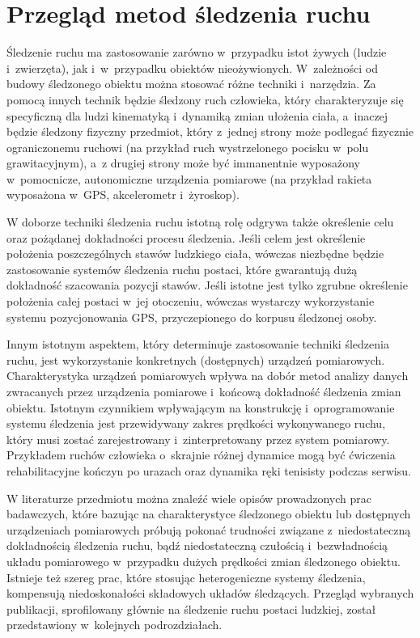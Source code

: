 \chapter{Przegląd metod śledzenia ruchu}\label{chap:literature}

Śledzenie ruchu ma zastosowanie zarówno w~przypadku istot żywych (ludzie i~zwierzęta), jak i~w~przypadku obiektów nieożywionych. W~zależności od budowy śledzonego obiektu można stosować różne techniki i~narzędzia. Za pomocą innych technik będzie śledzony ruch człowieka, który charakteryzuje się specyficzną dla ludzi kinematyką i~dynamiką zmian ułożenia ciała, a~inaczej będzie śledzony fizyczny przedmiot, który z~jednej strony może podlegać fizycznie ograniczonemu ruchowi (na przykład ruch wystrzelonego pocisku w~polu grawitacyjnym), a~z drugiej strony może być immanentnie wyposażony w~pomocnicze, autonomiczne urządzenia pomiarowe (na przykład rakieta wyposażona w~GPS, akcelerometr i~żyroskop). 

W doborze techniki śledzenia ruchu istotną rolę odgrywa także określenie celu oraz pożądanej dokładności procesu śledzenia. Jeśli celem jest określenie położenia poszczególnych stawów ludzkiego ciała, wówczas niezbędne będzie zastosowanie systemów śledzenia ruchu postaci, które gwarantują dużą dokładność szacowania pozycji stawów. Jeśli istotne jest tylko zgrubne określenie położenia całej postaci w~jej otoczeniu, wówczas wystarczy wykorzystanie systemu pozycjonowania GPS, przyczepionego do korpusu śledzonej osoby.

Innym istotnym aspektem, który determinuje zastosowanie techniki śledzenia ruchu, jest wykorzystanie konkretnych (dostępnych) urządzeń pomiarowych. Charakterystyka urządzeń pomiarowych wpływa na dobór metod analizy danych zwracanych przez urządzenia pomiarowe i~końcową dokładność śledzenia zmian obiektu. Istotnym czynnikiem wpływającym na konstrukcję i~oprogramowanie systemu śledzenia jest przewidywany zakres prędkości wykonywanego ruchu, który musi zostać zarejestrowany i~zinterpretowany przez system pomiarowy. Przykładem ruchów człowieka o~skrajnie różnej dynamice  mogą być ćwiczenia rehabilitacyjne kończyn po urazach oraz dynamika ręki tenisisty podczas serwisu.  

W literaturze przedmiotu można znaleźć wiele opisów prowadzonych prac badawczych, które bazując na charakterystyce śledzonego obiektu lub dostępnych urządzeniach pomiarowych próbują pokonać trudności związane z~niedostateczną dokładnością śledzenia ruchu, bądź niedostateczną czułością i~bezwładnością układu pomiarowego w~przypadku dużych prędkości zmian śledzonego obiektu. Istnieje też szereg prac, które stosując heterogeniczne systemy śledzenia, kompensują niedoskonałości składowych układów śledzących. 
Przegląd wybranych publikacji, sprofilowany głównie na śledzenie ruchu postaci ludzkiej, został przedstawiony w~kolejnych podrozdziałach.

